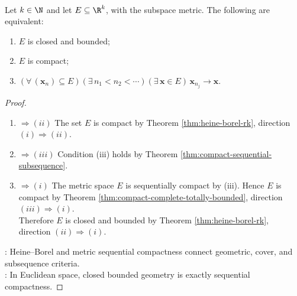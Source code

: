 \begin{corollary} \label{cor:heine-borel-rk-sequential-form} \\
Let $k\in\N$ and let $E\subseteq\R^k$, with the subspace metric. The following are equivalent:
\begin{enumerate}[label=(\roman*)]
\setlength{\itemsep}{0pt}
\item $E$ is closed and bounded;
\item $E$ is compact;
\item $(\forall\,(\mathbf{x}_n)\subseteq E)(\exists\,n_1<n_2<\cdots)(\exists\,\mathbf{x}\in E)\,\mathbf{x}_{n_j}\to\mathbf{x}$.
\end{enumerate}
\begin{proof}
\begin{enumerate}[label=(\roman*)]
\setlength{\itemsep}{0pt}
\item[$(i)$]$\Rightarrow (ii)$ The set $E$ is compact by Theorem \ref{thm:heine-borel-rk}, direction $(i)\Rightarrow(ii)$.
\item[$(ii)$]$\Rightarrow (iii)$ Condition (iii) holds by Theorem \ref{thm:compact-sequential-subsequence}.
\item[$(iii)$]$\Rightarrow (i)$ The metric space $E$ is sequentially compact by (iii). Hence $E$ is compact by Theorem \ref{thm:compact-complete-totally-bounded}, direction $(iii)\Rightarrow(i)$.\\
Therefore $E$ is closed and bounded by Theorem \ref{thm:heine-borel-rk}, direction $(ii)\Rightarrow(i)$.
\end{enumerate}
: Heine--Borel and metric sequential compactness connect geometric, cover, and subsequence criteria.\\
: In Euclidean space, closed bounded geometry is exactly sequential compactness.
\end{proof}
\end{corollary}

